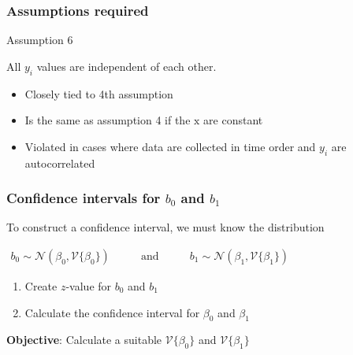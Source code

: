 \begin{frame}\frametitle{Assumptions required}
	\begin{block}
		{Assumption 6} 
		\begin{center}
			All $y_i$ values are independent of each other. 
		\end{center}
	\end{block}
	\begin{itemize}
		\item	Closely tied to 4th assumption 
		\item	Is the same as assumption 4 if the $\mathrm{x}$ are constant 
		\item	Violated in cases where data are collected in time order and $y_i$ are autocorrelated 
	\end{itemize}
\end{frame}

\begin{frame}\frametitle{Confidence intervals for $b_0$ and $b_1$}
	
	To construct a confidence interval, we must know the distribution
	
	$ 
	\begin{array}{lcr}
		b_0 \sim \mathcal{N}(\beta_0, \mathcal{V}\{\beta_0\}) &\qquad\text{and}\qquad& b_1 \sim \mathcal{N}(\beta_1,\mathcal{V}\{\beta_1\}) 
	\end{array}
	$
	\begin{enumerate}
		\item	Create $z$-value for $b_0$ and $b_1$ 
		\item	Calculate the confidence interval for $\beta_0$ and $\beta_1$ 
	\end{enumerate}
	
	\textbf{Objective}: Calculate a suitable $\mathcal{V}\{\beta_0\}$ and $\mathcal{V}\{\beta_1\}$
\end{frame}

